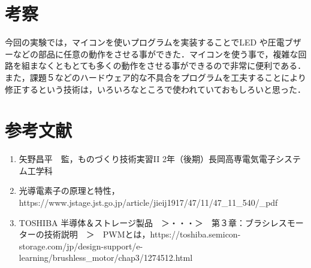 \documentclass {ujarticle}
\begin{document}
 \section{考察}
 今回の実験では，マイコンを使いプログラムを実装することでLED や圧電ブザーなどの部品に任意の動作をさせる事ができた．マイコンを使う事で，複雑な回路を組まなくともとても多くの動作をさせる事ができるので非常に便利である．また，課題５などのハードウェア的な不具合をプログラムを工夫することにより修正するという技術は，いろいろなところで使われていておもしろいと思った．
 \section{参考文献}
 \begin{enumerate}
 \item 矢野昌平　監，ものづくり技術実習II 2年（後期）長岡高専電気電子システム工学科 
 \item 光導電素子の原理と特性，https://www.jstage.jst.go.jp/article/jieij1917/47/11/47\_11\_540/\_pdf
 \item TOSHIBA 半導体＆ストレージ製品　＞・・・＞　第３章：ブラシレスモーターの技術説明　＞　PWMとは，https://toshiba.semicon-storage.com/jp/design-support/e-learning/brushless\_motor/chap3/1274512.html 
  \end{enumerate}
 
 
 
 
 
 
 
 
 
 
 
 
 
 
 
 
 
 
 
 
 
 
 
\end{document}
